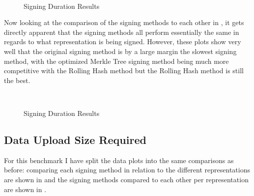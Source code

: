 \begin{figure}
    \centering
     \\
    \caption{Signing Duration Results}
    \label{fig:sign-dur1}
\end{figure}

Now looking at the comparison of the signing methods to each other in , it gets directly apparent that the signing methods all perform essentially the same in regards to what representation is being signed. However, these plots show very well that the original signing method is by a large margin the slowest signing method, with the optimized Merkle Tree signing method being much more competitive with the Rolling Hash method but the Rolling Hash method is still the best.

\begin{figure}
    \centering
     \\
    \caption{Signing Duration Results}
    \label{fig:sign-dur2}
\end{figure}

\subsection{Data Upload Size Required}

For this benchmark I have split the data plots into the same comparisons as before: comparing each signing method in relation to the different representations are shown in  and the signing methods compared to each other per representation are shown in .

